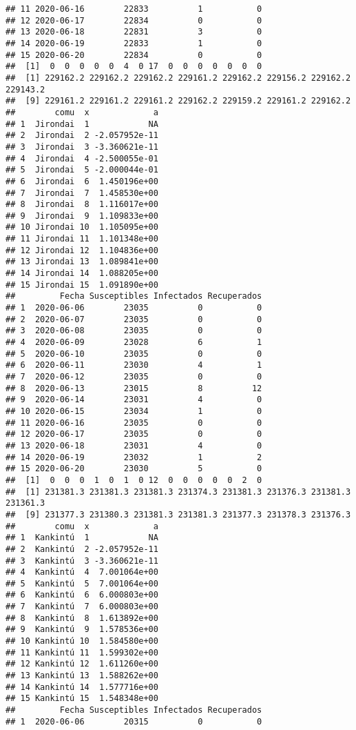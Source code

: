 \documentclass[
]{article}
\begin{document}
\begin{verbatim}
## 11 2020-06-16        22833          1           0
## 12 2020-06-17        22834          0           0
## 13 2020-06-18        22831          3           0
## 14 2020-06-19        22833          1           0
## 15 2020-06-20        22834          0           0
##  [1]  0  0  0  0  0  4  0 17  0  0  0  0  0  0  0
##  [1] 229162.2 229162.2 229162.2 229161.2 229162.2 229156.2 229162.2 229143.2
##  [9] 229161.2 229161.2 229161.2 229162.2 229159.2 229161.2 229162.2
##        comu  x             a
## 1  Jirondai  1            NA
## 2  Jirondai  2 -2.057952e-11
## 3  Jirondai  3 -3.360621e-11
## 4  Jirondai  4 -2.500055e-01
## 5  Jirondai  5 -2.000044e-01
## 6  Jirondai  6  1.450196e+00
## 7  Jirondai  7  1.458530e+00
## 8  Jirondai  8  1.116017e+00
## 9  Jirondai  9  1.109833e+00
## 10 Jirondai 10  1.105095e+00
## 11 Jirondai 11  1.101348e+00
## 12 Jirondai 12  1.104836e+00
## 13 Jirondai 13  1.089841e+00
## 14 Jirondai 14  1.088205e+00
## 15 Jirondai 15  1.091890e+00
##         Fecha Susceptibles Infectados Recuperados
## 1  2020-06-06        23035          0           0
## 2  2020-06-07        23035          0           0
## 3  2020-06-08        23035          0           0
## 4  2020-06-09        23028          6           1
## 5  2020-06-10        23035          0           0
## 6  2020-06-11        23030          4           1
## 7  2020-06-12        23035          0           0
## 8  2020-06-13        23015          8          12
## 9  2020-06-14        23031          4           0
## 10 2020-06-15        23034          1           0
## 11 2020-06-16        23035          0           0
## 12 2020-06-17        23035          0           0
## 13 2020-06-18        23031          4           0
## 14 2020-06-19        23032          1           2
## 15 2020-06-20        23030          5           0
##  [1]  0  0  0  1  0  1  0 12  0  0  0  0  0  2  0
##  [1] 231381.3 231381.3 231381.3 231374.3 231381.3 231376.3 231381.3 231361.3
##  [9] 231377.3 231380.3 231381.3 231381.3 231377.3 231378.3 231376.3
##        comu  x             a
## 1  Kankintú  1            NA
## 2  Kankintú  2 -2.057952e-11
## 3  Kankintú  3 -3.360621e-11
## 4  Kankintú  4  7.001064e+00
## 5  Kankintú  5  7.001064e+00
## 6  Kankintú  6  6.000803e+00
## 7  Kankintú  7  6.000803e+00
## 8  Kankintú  8  1.613892e+00
## 9  Kankintú  9  1.578536e+00
## 10 Kankintú 10  1.584580e+00
## 11 Kankintú 11  1.599302e+00
## 12 Kankintú 12  1.611260e+00
## 13 Kankintú 13  1.588262e+00
## 14 Kankintú 14  1.577716e+00
## 15 Kankintú 15  1.548348e+00
##         Fecha Susceptibles Infectados Recuperados
## 1  2020-06-06        20315          0           0

\end{verbatim}
\end{document}
